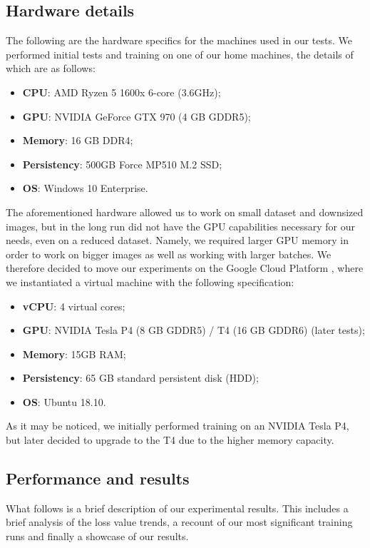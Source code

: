 \documentclass[twoside,twocolumn]{article}
\begin{document}
\subsection{Hardware details}

The following are the hardware specifics for the machines used in our tests. We performed initial tests and training on one of our home machines, the details of which are as follows:
\begin{itemize}
\item \textbf{CPU}: AMD Ryzen 5 1600x  6-core (3.6GHz);
\item \textbf{GPU}: NVIDIA GeForce GTX 970 (4 GB GDDR5); 
\item \textbf{Memory}: 16 GB DDR4;
\item \textbf{Persistency}: 500GB Force MP510 M.2 SSD;
\item \textbf{OS}: Windows 10 Enterprise.
\end{itemize}

The aforementioned hardware allowed us to work on small dataset and downsized images, but in the long run did not have the GPU capabilities necessary for our needs, even on a reduced dataset. Namely, we required larger GPU memory in order to work on bigger images as well as working with larger batches. We therefore decided to move our experiments on the Google Cloud Platform \cite{GCP}, where we instantiated a virtual machine with the following specification:

\begin{itemize}
	\item \textbf{vCPU}: 4 virtual cores;
	\item \textbf{GPU}: NVIDIA Tesla P4 (8 GB GDDR5) / T4 (16 GB GDDR6) (later tests); 
	\item \textbf{Memory}: 15GB RAM;
	\item \textbf{Persistency}: 65 GB standard persistent disk (HDD);
	\item \textbf{OS}: Ubuntu 18.10.
\end{itemize}

As it may be noticed, we initially performed training on an NVIDIA Tesla P4, but later decided to upgrade to the T4 due to the higher memory capacity.


\subsection{Performance and results}

What follows is a brief description of our experimental results. This includes a brief analysis of the loss value trends, a recount of our most significant training runs and finally a showcase of our results.
\end{document}
